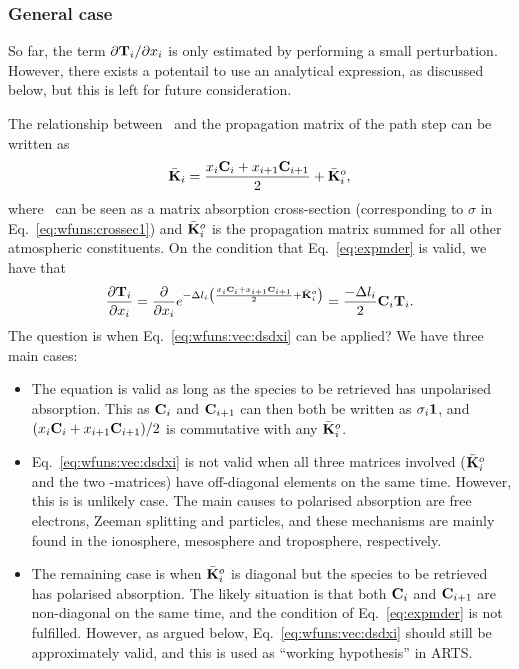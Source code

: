 \subsubsection{General case}
%
So far, the term $\partial\mathbf{T}_{i}/\partial x_{i}$ is only estimated by
performing a small perturbation. However, there exists a potentail to use an
analytical expression, as discussed below, but this is left for future
consideration.

The relationship between \ and the propagation matrix of the path
step can be written as
\begin{equation}
  \bar{{\bf K}}_i = \frac{x_{i}\mathbf{C}_i+
                      x_{i+1}\mathbf{C}_{i+1}}{2} + \bar{{\bf K}}_i^o,
\end{equation}
where \ can be seen as a matrix absorption cross-section
(corresponding to $\sigma$ in Eq.~\ref{eq:wfuns:crossec1}) and
$\bar{{\bf K}}_i^o$ is the propagation matrix summed for all other atmospheric
constituents. 
On the condition that Eq.~\ref{eq:expmder} is valid, we have that
\begin{equation}
  \frac{\partial\mathbf{T}_{i}}{\partial x_{i}} = 
  \frac{\partial}{\partial x_{i}} 
  e^{-\Delta l_{i}\left(\frac{x_{i}\mathbf{C}_i+
            x_{i+1}\mathbf{C}_{i+1}}{2} + \bar{{\bf K}}_i^o \right)} =
  \frac{-\Delta l_{i}}{2} \mathbf{C}_i\mathbf{T}_{i}.
  \label{eq:wfuns:vec:dsdxi}
\end{equation}
The question is when Eq.~\ref{eq:wfuns:vec:dsdxi} can be applied? We have three
main cases:
\begin{itemize}
\item The equation is valid as long as the species to be retrieved has
  unpolarised absorption. This as $\mathbf{C}_i$ and $\mathbf{C}_{i+1}$ can
  then both be written as $\sigma_i\mathbf{1}$, and
  $(x_{i}\mathbf{C}_i+x_{i+1}\mathbf{C}_{i+1})/2$ is commutative
  with any $\bar{{\bf K}}_i^o$.
\item Eq.~\ref{eq:wfuns:vec:dsdxi} is not valid when all three matrices
  involved ($\bar{{\bf K}}_i^o$ and the two -matrices) have
  off-diagonal elements on the same time. However, this is is unlikely case.
  The main causes to polarised absorption are free electrons, Zeeman splitting
  and particles, and these mechanisms are mainly found in the ionosphere,
  mesosphere and troposphere, respectively.
\item The remaining case is when $\bar{{\bf K}}_i^o$ is diagonal but the
  species to be retrieved has polarised absorption. The likely situation is
  that both $\mathbf{C}_i$ and $\mathbf{C}_{i+1}$ are non-diagonal on the same
  time, and the condition of Eq.~\ref{eq:expmder} is not fulfilled. However, as
  argued below, Eq.~\ref{eq:wfuns:vec:dsdxi} should still be approximately
  valid, and this is used as ``working hypothesis'' in ARTS.
\end{itemize}
